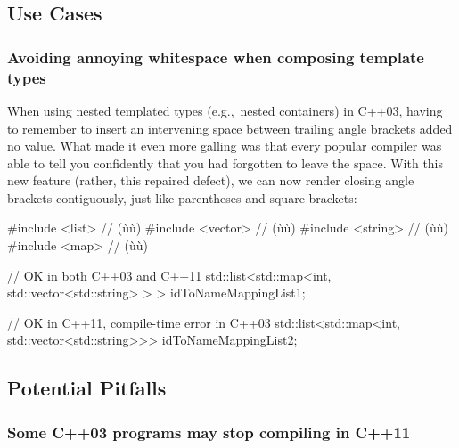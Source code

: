 \subsection[Use Cases]{Use Cases}\label{use-cases}

\subsubsection[Avoiding annoying whitespace when composing template types]{Avoiding annoying whitespace when composing template types}\label{avoiding-annoying-whitespace-when-composing-template-types}

When using nested templated types (e.g.,~nested containers) in C++03,
having to remember to insert an intervening space between trailing angle
brackets added no value. What made it even more galling was that every
popular compiler was able to tell you confidently that you had forgotten
to leave the space. With this new
feature (rather, this repaired defect), we can now render closing angle
brackets contiguously, just like parentheses and square brackets:

\begin{emcppshiddenlisting}[emcppsbatch=e3]
#include <list>    // (ù{}ù)
#include <vector>  // (ù{}ù)
#include <string>  // (ù{}ù)
#include <map>     // (ù{}ù)
\end{emcppshiddenlisting}
\begin{emcppslisting}[emcppsbatch=e3]
// OK in both C++03 and C++11
std::list<std::map<int, std::vector<std::string> > > idToNameMappingList1;

// OK in C++11, compile-time error in C++03
std::list<std::map<int, std::vector<std::string>>>   idToNameMappingList2;
\end{emcppslisting}


\subsection[Potential Pitfalls]{Potential Pitfalls}\label{potential-pitfalls}

\subsubsection[Some C++03 programs may stop compiling in C++11]{Some C++03 programs may stop compiling in C++11}\label{some-c++03-programs-may-stop-working-in-c++11}

